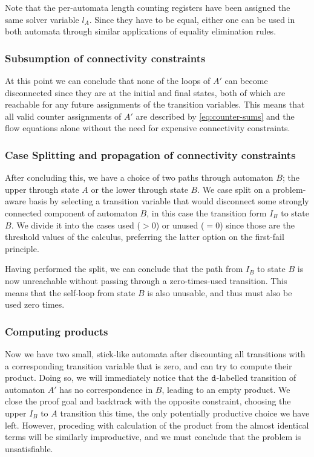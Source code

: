 Note that the per-automata length counting registers have been assigned the same
solver variable $l_A$. Since they have to be equal, either one can be used in
both automata through similar applications of equality elimination rules.

\subsubsection{Subsumption of connectivity constraints}\label{sec:intuition:subsume}
At this point we can conclude that none of the loops of $A'$ can become
disconnected since they are at the initial and final states, both of which are
reachable for any future assignments of the transition variables. This means
that all valid counter assignments of $A'$ are described by
\cref{eq:counter-sums} and the flow equations alone without the need for
expensive connectivity constraints.

\subsubsection{Case Splitting and propagation of connectivity constraints}\label{sec:intuition:split}
After concluding this, we have a choice of two paths through automaton $B$; the
upper through state $A$ or the lower through state $B$. We case split on a
problem-aware basis by selecting a transition variable that would disconnect
some strongly connected component of automaton $B$, in this case the transition
form $I_B$ to state $B$. We divide it into the cases used ($> 0$) or unused ($ =
0$) since those are the threshold values of the calculus, preferring the latter
option on the first-fail principle.

Having performed the split, we can conclude that the path from $I_B$ to state
$B$ is now unreachable without passing through a zero-times-used transition.
This means that the self-loop from state $B$ is also unusable, and thus must
also be used zero times.

\subsubsection{Computing products}\label{sec:intuition:materialise}
Now we have two small, stick-like automata after discounting all
transitions with a corresponding transition variable that is zero, and can try
to compute their product. Doing so, we will immediately notice that the
$\texttt{d}$-labelled transition of automaton $A'$ has no correspondence in $B$,
leading to an empty product. We close the proof goal and backtrack with the
opposite constraint, choosing the upper $I_B$ to $A$ transition this time, the
only potentially productive choice we have left. However, proceding with
calculation of the product from the almost identical terms will be similarly
improductive, and we must conclude that the problem is unsatisfiable.


